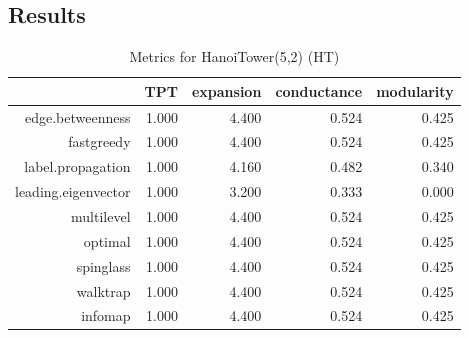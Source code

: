\documentclass[paper=a4, fontsize=11pt]{scrartcl} %
\begin{document}
\subsection{Results}
\begin{table}[ht]
\centering
\begin{tabular}{rrrrr}
  \hline
 & TPT & expansion & conductance & modularity \\ 
  \hline
edge.betweenness & 1.000 & 4.400 & 0.524 & 0.425 \\ 
  
             fastgreedy & 1.000 & 4.400 & 0.524 & 0.425 \\ 
  
             label.propagation & 1.000 & 4.160 & 0.482 & 0.340 \\ 
  
             leading.eigenvector & 1.000 & 3.200 & 0.333 & 0.000 \\ 
  
             multilevel & 1.000 & 4.400 & 0.524 & 0.425 \\ 
  
             optimal & 1.000 & 4.400 & 0.524 & 0.425 \\ 
  
             spinglass & 1.000 & 4.400 & 0.524 & 0.425 \\ 
  
             walktrap & 1.000 & 4.400 & 0.524 & 0.425 \\ 
  
             infomap & 1.000 & 4.400 & 0.524 & 0.425 \\ 
   \hline
\end{tabular}
\caption{Metrics for HanoiTower(5,2) (HT)} 
\end{table}
\end{document}
